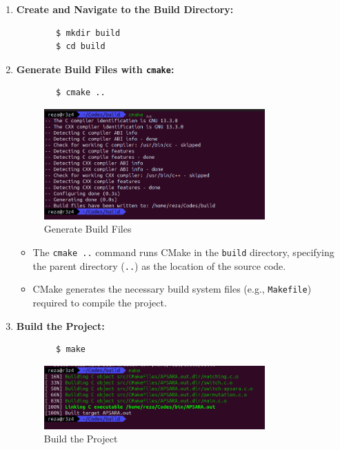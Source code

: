 \documentclass[12pt	]{article}
\begin{document}
\begin{enumerate}
	\item \textbf{Create and Navigate to the Build Directory:}
	\begin{verbatim}
		$ mkdir build
		$ cd build
	\end{verbatim}
	
	\item \textbf{Generate Build Files with \texttt{cmake}:}
	\begin{verbatim}
		$ cmake ..
	\end{verbatim}
	
	\begin{figure}[h!]
		\centering
		\includegraphics[width=0.8\textwidth]{Images/img1.png}
		\caption{Generate Build Files}
		\label{fig:Generate Build Files}
	\end{figure}
	
	\begin{itemize}
		\item The \texttt{cmake ..} command runs CMake in the \texttt{build} directory, specifying the parent directory (\texttt{..}) as the location of the source code.
		\item CMake generates the necessary build system files (e.g., \texttt{Makefile}) required to compile the project.
	\end{itemize}
	
	\item \textbf{Build the Project:}
	\begin{verbatim}
		$ make
	\end{verbatim}
	\newpage
	
	\begin{figure}[h!]
		\centering
		\includegraphics[width=0.8\textwidth]{Images/img2.png}
		\caption{Build the Project}
		\label{fig:Build the Project}
	\end{figure}
	

\end{enumerate}
\end{document}
